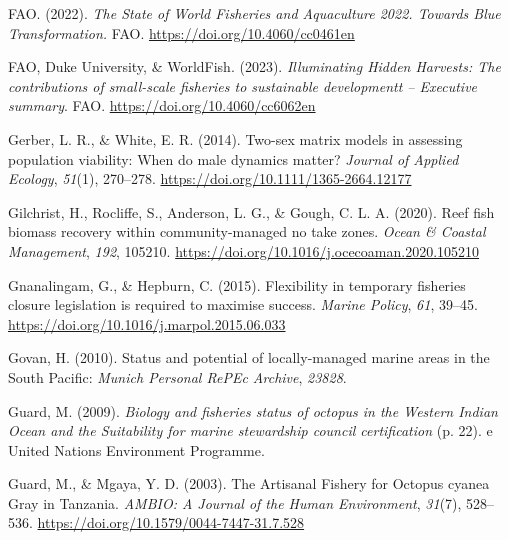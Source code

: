 \documentclass[
]{article}
\newlength{\cslhangindent}
\newlength{\cslentryspacingunit} %
\newenvironment{CSLReferences}[2] %
 {%
  \setlength{\parindent}{0pt}
  \ifodd #1
  \let\oldpar\par
  \def\par{\hangindent=\cslhangindent\oldpar}
  \fi
  \setlength{\parskip}{#2\cslentryspacingunit}
 }%
 {}
\begin{document}
\begin{CSLReferences}{1}{2}
\leavevmode{}%
FAO. (2022). \emph{The {State} of {World Fisheries} and {Aquaculture} 2022. Towards {Blue Transformation}.} FAO. \url{https://doi.org/10.4060/cc0461en}

\leavevmode{}%
FAO, Duke University, \& WorldFish. (2023). \emph{Illuminating {Hidden Harvests}: The contributions of small-scale fisheries to sustainable developmentt -- {Executive} summary}. FAO. \url{https://doi.org/10.4060/cc6062en}

\leavevmode{}%
Gerber, L. R., \& White, E. R. (2014). Two-sex matrix models in assessing population viability: When do male dynamics matter? \emph{Journal of Applied Ecology}, \emph{51}(1), 270--278. \url{https://doi.org/10.1111/1365-2664.12177}

\leavevmode{}%
Gilchrist, H., Rocliffe, S., Anderson, L. G., \& Gough, C. L. A. (2020). Reef fish biomass recovery within community-managed no take zones. \emph{Ocean \& Coastal Management}, \emph{192}, 105210. \url{https://doi.org/10.1016/j.ocecoaman.2020.105210}

\leavevmode{}%
Gnanalingam, G., \& Hepburn, C. (2015). Flexibility in temporary fisheries closure legislation is required to maximise success. \emph{Marine Policy}, \emph{61}, 39--45. \url{https://doi.org/10.1016/j.marpol.2015.06.033}

\leavevmode{}%
Govan, H. (2010). Status and potential of locally-managed marine areas in the {South Pacific}: \emph{Munich Personal RePEc Archive}, \emph{23828}.

\leavevmode{}%
Guard, M. (2009). \emph{Biology and fisheries status of octopus in the {Western Indian Ocean} and the {Suitability} for marine stewardship council certification} (p. 22). e United Nations Environment Programme.

\leavevmode{}%
Guard, M., \& Mgaya, Y. D. (2003). The {Artisanal Fishery} for {Octopus} cyanea {Gray} in {Tanzania}. \emph{AMBIO: A Journal of the Human Environment}, \emph{31}(7), 528--536. \url{https://doi.org/10.1579/0044-7447-31.7.528}


\end{CSLReferences}
\end{document}
